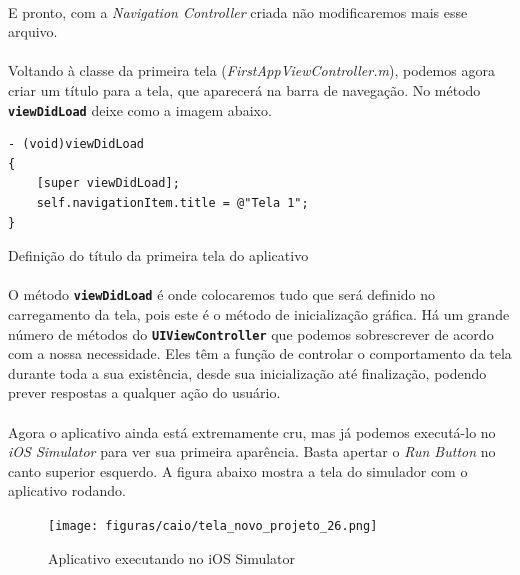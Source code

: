 \documentclass[a4paper,12pt,brazil,doubleside]{book}
\begin{document}
\begin{singlespace}
\paragraph{}E pronto, com a \emph{Navigation Controller} criada não modificaremos mais esse arquivo.

\bigskip

\paragraph{}Voltando à classe da primeira tela (\emph{FirstAppViewController.m}), podemos agora criar um título para a tela, que aparecerá na barra de navegação. No método \texttt{\textbf{viewDidLoad}} deixe como a imagem abaixo.

\begin{listing}[H]
\begin{verbatim}
- (void)viewDidLoad
{
    [super viewDidLoad];
    self.navigationItem.title = @"Tela 1";
}
\end{verbatim}
\caption{Definição do título da primeira tela do aplicativo}
\end{listing}

\paragraph{}O método \texttt{\textbf{viewDidLoad}} é onde colocaremos tudo que será definido no carregamento da tela, pois este é o método de inicialização gráfica. Há um grande número de métodos do \texttt{\textbf{UIViewController}} que podemos sobrescrever de acordo com a nossa necessidade. Eles têm a função de controlar o comportamento da tela durante toda a sua existência, desde sua inicialização até finalização, podendo prever respostas a qualquer ação do usuário.
\paragraph{}Agora o aplicativo ainda está extremamente cru, mas já podemos executá-lo no \emph{iOS Simulator} para ver sua primeira aparência. Basta apertar o \emph{Run Button} no canto superior esquerdo. A figura abaixo mostra a tela do simulador com o aplicativo rodando.

\bigskip
\bigskip

\begin{figure}[H]
  \centering
  \texttt{[image: figuras/caio/tela\_novo\_projeto\_26.png]}
  \caption{Aplicativo executando no iOS Simulator}
  \label{fig:a}
\end{figure}


\end{singlespace}
\end{document}
